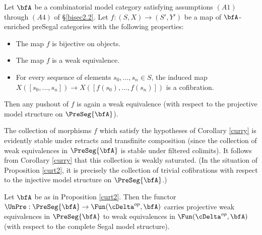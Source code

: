 \begin{corollary}\label{curry}
Let $\bfA$ be a combinatorial model category satisfying assumptions $(A1)$ through
$(A4)$ of \S \ref{bisec2.2}. 
Let $f: (S, X) \rightarrow (S', Y')$ be a map of $\bfA$-enriched preSegal categories with the following
properties:
\begin{itemize}
\item[$(a)$] The map $f$ is bijective on objects.
\item[$(b)$] The map $f$ is a weak equivalence.
\item[$(c)$] For every sequence of elements $s_0, \ldots, s_n \in S$, the induced map
$X( [s_0, \ldots, s_n] ) \rightarrow X([ f(s_0), \ldots, f(s_n)] )$ is a cofibration.
\end{itemize}
Then any pushout of $f$ is again a weak equivalence (with respect to the projective
model structure on $\PreSeg{\bfA}$).
\end{corollary}

\begin{remark}\label{coper}
The collection of morphisms $f$ which satisfy the hypotheses of Corollary \ref{curry} is evidently stable under retracts and transfinite composition (since the collection of weak equivalences in $\PreSeg{\bfA}$ is stable under filtered colimits). It follows from Corollary \ref{curry} that this collection is weakly saturated. (In the situation of Proposition \ref{curt2}, it is precisely the collection of trivial cofibrations
with respect to the injective model structure on $\PreSeg{\bfA}$.)
\end{remark}

\begin{lemma}\label{sacurt}
Let $\bfA$ be as in Proposition \ref{curt2}. Then the functor
$\UnPre: \PreSeg{\bfA} \rightarrow \Fun( \cDelta^{op}, \bfA)$ carries
projective weak equivalences in $\PreSeg{\bfA}$ to weak equivalences
in $\Fun( \cDelta^{op}, \bfA)$ (with respect to the complete Segal model structure).
\end{lemma}

